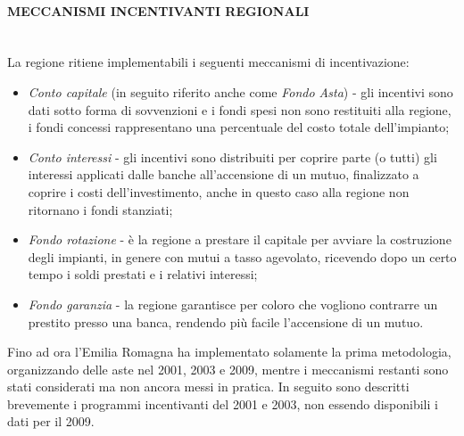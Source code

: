 \documentclass[12pt,a4paper,openright,twoside]{report}
\newcommand{\myparagraph}[1]{\paragraph{#1}\mbox{}\\}
\begin{document}
\myparagraph{MECCANISMI INCENTIVANTI REGIONALI}
La regione ritiene implementabili i seguenti meccanismi di incentivazione: 
\begin{itemize}
\item \emph{Conto capitale} (in seguito riferito anche come \emph{Fondo Asta}) - gli incentivi sono dati sotto forma di sovvenzioni e i fondi spesi non sono restituiti alla regione, i fondi concessi rappresentano una percentuale del costo totale dell'impianto;
\item \emph{Conto interessi} - gli incentivi sono distribuiti per coprire parte (o tutti) gli interessi applicati dalle banche all'accensione di un mutuo, finalizzato a coprire i costi dell'investimento, anche in questo caso alla regione non ritornano i fondi stanziati;
\item \emph{Fondo rotazione} - è la regione a prestare il capitale per avviare la costruzione degli impianti, in genere con mutui a tasso agevolato, ricevendo dopo un certo tempo i soldi prestati e i relativi interessi; 
\item \emph{Fondo garanzia} - la regione garantisce per coloro che vogliono contrarre un prestito presso una banca, rendendo più facile l'accensione di un mutuo.
\end{itemize}
Fino ad ora l'Emilia Romagna ha implementato solamente la prima metodologia, organizzando delle aste nel 2001, 2003 e 2009, mentre i meccanismi restanti sono stati considerati ma non ancora messi in pratica. In seguito sono descritti brevemente i programmi incentivanti del 2001 e 2003, non essendo disponibili i dati per il 2009.
\end{document}
